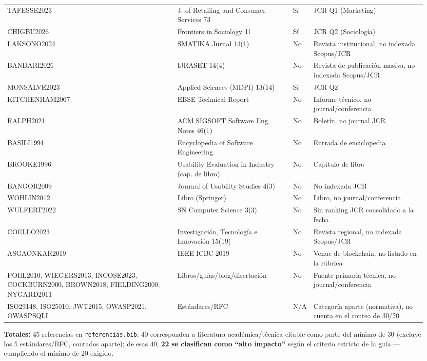 \begin{table}[H]
\begin{tabular}{@{}p{2.6cm}p{6.4cm}p{1.8cm}p{2.8cm}@{}}
TAFESSE2023    & J. of Retailing and Consumer Services 73 & Sí & JCR Q1 (Marketing) \\
CHIGBU2026     & Frontiers in Sociology 11          & Sí & JCR Q2 (Sociología) \\
LAKSONO2024    & SMATIKA Jurnal 14(1)              & No & Revista institucional, no indexada Scopus/JCR \\
BANDARI2026    & IJRASET 14(4)                     & No & Revista de publicación masiva, no indexada Scopus/JCR \\
MONSALVE2023   & Applied Sciences (MDPI) 13(14)    & Sí & JCR Q2 \\
KITCHENHAM2007 & EBSE Technical Report             & No & Informe técnico, no journal/conferencia \\
RALPH2021      & ACM SIGSOFT Software Eng. Notes 46(1) & No & Boletín, no journal JCR \\
BASILI1994     & Encyclopedia of Software Engineering & No & Entrada de enciclopedia \\
BROOKE1996     & Usability Evaluation in Industry (cap. de libro) & No & Capítulo de libro \\
BANGOR2009     & Journal of Usability Studies 4(3) & No & No indexada JCR \\
WOHLIN2012     & Libro (Springer)                  & No & Libro, no journal/conferencia \\
WULFERT2022    & SN Computer Science 3(3)          & No & Sin ranking JCR consolidado a la fecha \\
COELLO2023     & Investigación, Tecnología e Innovación 15(19) & No & Revista regional, no indexada Scopus/JCR \\
ASGAONKAR2019  & IEEE ICBC 2019                    & No & Venue de blockchain, no listado en la rúbrica \\
POHL2010, WIEGERS2013, INCOSE2023, COCKBURN2000, BROWN2018, FIELDING2000, NYGARD2011 & Libros/guías/blog/disertación & No & Fuente primaria técnica, no journal/conferencia \\
ISO29148, ISO25010, JWT2015, OWASP2021, OWASPSQLI & Estándares/RFC & N/A & Categoría aparte (normativa), no cuenta en el conteo de 30/20 \\
\bottomrule
\end{tabular}
\end{table}

\textbf{Totales:} 45 referencias en \texttt{referencias.bib}; 40
corresponden a literatura académica/técnica citable como parte del
mínimo de 30 (excluye los 5 estándares/RFC, contados aparte); de esas 40,
\textbf{22 se clasifican como ``alto impacto''} según el criterio
estricto de la guía --- cumpliendo el mínimo de 20 exigido.
